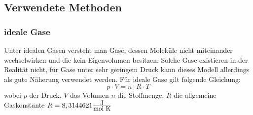 \subsection{Verwendete Methoden}
\subsubsection{ideale Gase}
Unter idealen Gasen versteht man Gase, dessen Moleküle nicht miteinander wechselwirken und die kein Eigenvolumen besitzen. Solche Gase existieren in der Realität nicht, für Gase unter sehr geringem Druck kann dieses Modell allerdings als gute Näherung verwendet werden. Für ideale Gase gilt folgende Gleichung:
\begin{equation}
p \cdot V = n \cdot R \cdot T
\end{equation}
wobei $p$ der Druck, $V$ das Volumen $n$ die Stoffmenge, $R$ die allgemeine Gaskonstante $R=8,3144621 \frac{\text{\fontsize{9}{1}\selectfont {J}}}{\text{\fontsize{9}{1}\selectfont {mol K}}}$